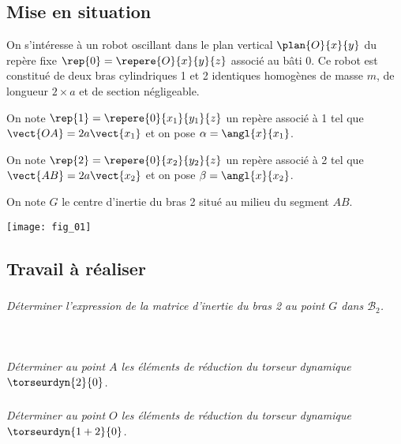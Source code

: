 \ifprof
\else
\begin{multicols}{2}
\fi

\subsection*{Mise en situation}
On s’intéresse à un robot oscillant dans le plan vertical $\plan{O}{x}{y}$ du repère fixe $\rep{0}=\repere{O}{x}{y}{z}$
associé au bâti 0.
Ce robot est constitué de deux bras cylindriques 1 et 2 identiques homogènes de masse $m$, de longueur
$2\times a$ et de section négligeable.

On note $\rep{1}=\repere{0}{x_1}{y_1}{z}$ un repère associé à 1 tel que $\vect{OA}=2a\vect{x_1}$ et on pose
$\alpha=\angl{x}{x_1}$. 

On note $\rep{2}=\repere{0}{x_2}{y_2}{z}$ un repère associé à 2 tel que $\vect{AB}=2a\vect{x_2}$ et on pose
$\beta=\angl{x}{x_2}$. 

On note $G$ le centre d’inertie du bras 2 situé au milieu du segment $AB$.

\begin{center}
\texttt{[image: fig\_01]}
\end{center}

\subsection*{Travail à réaliser}

\subparagraph{}
\textit{Déterminer l'expression de la matrice d'inertie du bras 2 au point $G$ dans $\mathcal{B}_2$.}
\ifprof
\begin{corrige}
~\\
\end{corrige}
\else
\fi



\subparagraph{}
\textit{Déterminer au point $A$ les éléments de réduction du torseur dynamique $\torseurdyn{2}{0}$.}
\ifprof
\begin{corrige}
\end{corrige}
\else
\fi

\subparagraph{}
\textit{Déterminer au point $O$ les éléments de réduction du torseur dynamique $\torseurdyn{1+2}{0}$.}
\ifprof
\begin{corrige}
\end{corrige}
\else
\fi



\ifprof


\end{multicols}
